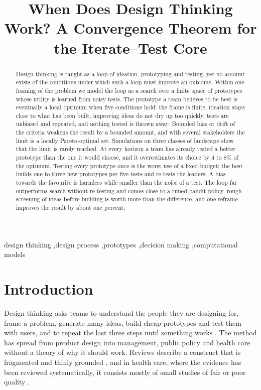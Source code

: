 \documentclass[preprint,review,11pt,authoryear]{elsarticle}
\theoremstyle{definition}
\begin{document}
\begin{frontmatter}
\title{When Does Design Thinking Work? A Convergence Theorem for the Iterate--Test Core}
\begin{abstract}
Design thinking is taught as a loop of ideation, prototyping and testing, yet no account exists of the conditions under which such a loop must improve an outcome. Within one framing of the problem we model the loop as a search over a finite space of prototypes whose utility is learned from noisy tests. The prototype a team believes to be best is eventually a local optimum when five conditions hold: the frame is finite, ideation stays close to what has been built, improving ideas do not dry up too quickly, tests are unbiased and repeated, and nothing tested is thrown away. Bounded bias or drift of the criteria weakens the result by a bounded amount, and with several stakeholders the limit is a locally Pareto-optimal set. Simulations on three classes of landscape show that the limit is rarely reached. At every horizon a team has already tested a better prototype than the one it would choose, and it overestimates its choice by 4 to 8\% of the optimum. Testing every prototype once is the worst use of a fixed budget; the best builds one to three new prototypes per five tests and re-tests the leaders. A bias towards the favourite is harmless while smaller than the noise of a test. The loop far outperforms search without re-testing and comes close to a tuned bandit policy, rough screening of ideas before building is worth more than the difference, and one reframe improves the result by about one percent.
\end{abstract}
\begin{keyword}
design thinking \sep design process \sep prototypes \sep decision making \sep computational models
\end{keyword}
\end{frontmatter}
\linenumbers
\section{Introduction}

Design thinking asks teams to understand the people they are designing for, frame a problem, generate many ideas, build cheap prototypes and test them with users, and to repeat the last three steps until something works \citep{dschool2010}. The method has spread from product design into management, public policy and health care \citep{liedtka2015, mintrom2016, altman2018} without a theory of why it should work. Reviews describe a construct that is fragmented and thinly grounded \citep{johansson2013, micheli2019}, and in health care, where the evidence has been reviewed systematically, it consists mostly of small studies of fair or poor quality \citep{altman2018}.
\end{document}
